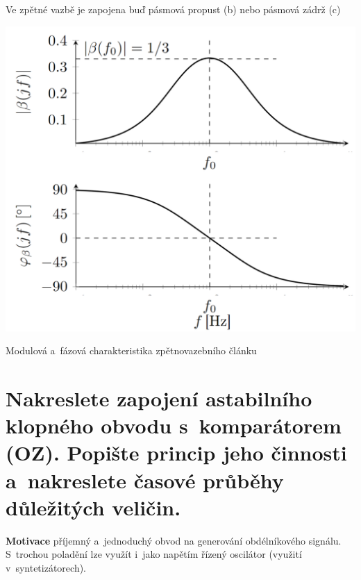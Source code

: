 \documentclass[a4paper,12pt]{article}   %
\begin{document}
Ve zpětné vazbě je zapojena buď pásmová propust (b) nebo pásmová zádrž (c)

\begin{graf}[h!]
    \centering
    \includegraphics[width = .5\textwidth]{modulova-charakteristika-zv-clanku-oscilator.PNG}
    \caption{Modulová a~fázová charakteristika zpětnovazebního článku}
    \label{graf:osc:modul:charstka}
\end{graf}







\section{Nakreslete zapojení astabilního klopného obvodu s~komparátorem (OZ). Popište princip jeho činnosti a~nakreslete časové průběhy důležitých veličin.}
\textbf{Motivace} příjemný a~jednoduchý obvod na generování obdélníkového signálu. S~trochou poladění lze využít i~jako napětím řízený oscilátor (využití v~syntetizátorech).
\end{document}
